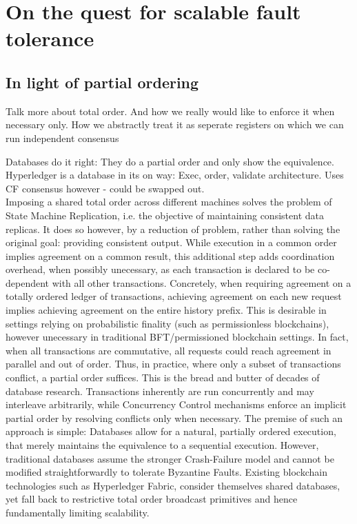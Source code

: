 \section{On the quest for scalable fault tolerance}


\subsection{In light of partial ordering}
Talk more about total order. 
And how we really would like to enforce it when necessary only.
How we abstractly treat it as seperate registers on which we can run independent consensus

Databases do it right: They do a partial order and only show the equivalence. 
Hyperledger is a database in its on way: Exec, order, validate architecture. Uses CF consensus however - could be swapped out.\\


Imposing a shared total order across different machines solves the problem of State Machine Replication, i.e. the objective of maintaining consistent data replicas. It does so however, by a reduction of problem, rather than solving the original goal: providing consistent output. While execution in a common order implies agreement on a common result, this additional step adds coordination overhead, when possibly unecessary, as each transaction is declared to be co-dependent with all other transactions.
Concretely, when requiring agreement on a totally ordered ledger of transactions, achieving agreement on each new request implies achieving agreement on the entire history prefix. This is desirable in settings relying on probabilistic finality (such as permissionless blockchains), however unecessary in traditional BFT/permissioned blockchain settings. In fact, when all transactions are commutative, all requests could reach agreement in parallel and out of order. Thus, in practice, where only a subset of transactions conflict, a partial order suffices. 
This is the bread and butter of decades of database research. Transactions inherently are run concurrently and may interleave arbitrarily, while Concurrency Control mechanisms enforce an implicit partial order by resolving conflicts only when necessary. The premise of such an approach is simple: Databases allow for a natural, partially ordered execution, that merely maintains the equivalence to a sequential execution.
However, traditional databases assume the stronger Crash-Failure model and cannot be modified straightforwardly to tolerate Byzantine Faults. Existing blockchain technologies such as Hyperledger Fabric, consider themselves shared databases, yet fall back to restrictive total order broadcast primitives and hence fundamentally limiting scalability. 


